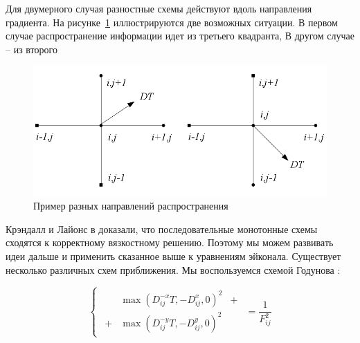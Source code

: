 
Для двумерного случая разностные схемы действуют вдоль направления
градиента. На рисунке~\ref{fig:upwind-schema} иллюстрируются две
возможных ситуации. В первом случае распространение информации идет из
третьего квадранта, В другом случае -- из второго
\begin{figure}[H]
  \centering
  \includegraphics[width=\linewidth]{img/upwind-schema.png}
  \hfil \caption{Пример разных направлений распространения}
  \label{fig:upwind-schema}

\end{figure}

Крэндалл и Лайонс в \cite{V1983} доказали, что последовательные
монотонные схемы сходятся к корректному вязкостному решению. Поэтому
мы можем развивать идеи дальше и применить сказанное выше к уравнениям
эйконала. Существует несколько различных схем приближения. Мы
воспользуемся схемой Годунова \cite{F2002}:

\begin{equation}
  \label{eq:godunov-schema}
  \begin{cases}
    \begin{matrix}
       &\max (D^{-x}_{ij}T, -D^{x}_{ij},0)^2 &+\\
     + &\max (D^{-y}_{ij}T, -D^{y}_{ij},0)^2&
    \end{matrix}
    \end{cases}= \frac{1}{F_{ij}^2}
\end{equation}




